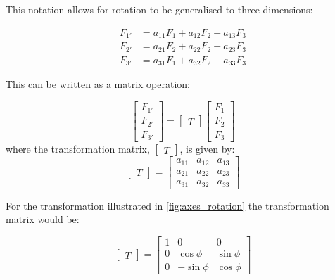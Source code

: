 This notation allows for rotation to be generalised to three dimensions:

\begin{align}
F_{1'}  &= a_{11}F_1 + a_{12} F_2 + a_{13} F_3 \nonumber\\
F_{2'}  &= a_{21}F_2 + a_{22} F_2 + a_{23} F_3 \\
F_{3'} &= a_{31}F_1 + a_{32} F_2 + a_{33} F_3 \nonumber
\end{align}

This can be written as a matrix operation:

\begin{equation}
\begin{bmatrix}
F_{1'} \\
F_{2'} \\
F_{3'}
\end{bmatrix} = 
\begin{bmatrix}
T
\end{bmatrix}
\begin{bmatrix}
F_1 \\ F_2 \\ F_3
\end{bmatrix}
\end{equation}
where the transformation matrix, $\begin{bmatrix}
T
\end{bmatrix}$, is given by:
\begin{equation}
\begin{bmatrix}
T
\end{bmatrix}
= \begin{bmatrix}
a_{11} & a_{12} & a_{13} \\
a_{21} & a_{22} & a_{23} \\
a_{31} & a_{32} & a_{33}
\end{bmatrix}
\end{equation}

For the transformation illustrated in \autoref{fig:axes_rotation} the transformation matrix would be:

\begin{equation}
\begin{bmatrix}
T
\end{bmatrix}
= \begin{bmatrix}
1 & 0 & 0 \\
0 & \cos\phi & \sin\phi \\
0 & -\sin\phi & \cos \phi
\end{bmatrix}
\end{equation}


